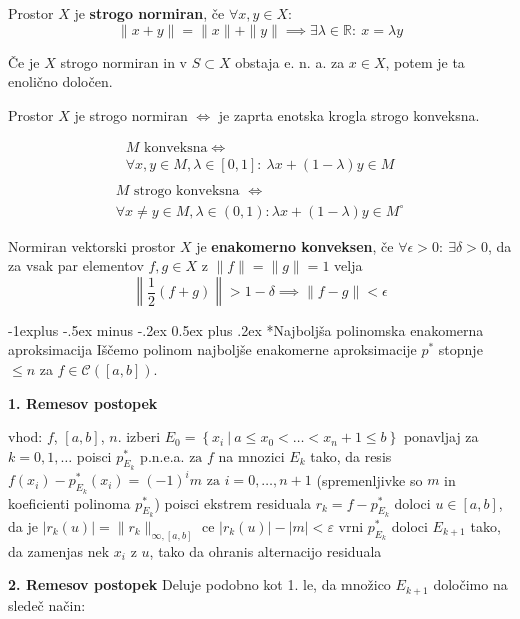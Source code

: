 \documentclass[a3paper,9pt]{extarticle}
\makeatletter
\renewcommand{\subsection}{\@startsection{subsection}{2}{0mm}%
                                {-1explus -.5ex minus -.2ex}%
                                {0.5ex plus .2ex}%
                                {\normalfont\normalsize\bfseries}}
\makeatother
\begin{document}
\begin{multicols}{5}
Prostor $X$ je \textbf{strogo normiran}, če $\forall x, y \in X$:
\[ \| x + y \| = \| x \| + \| y \| \implies \exists \lambda \in \mathbb{R} : \ x = \lambda y  \]

Če je $X$ strogo normiran in v $S \subset X$ obstaja e. n. a. za $x \in X$, potem je ta enolično določen.


Prostor $X$ je strogo normiran $\iff$ je zaprta enotska krogla strogo konveksna.

\begin{multline*}
	M \text{ konveksna} \iff \\
	\forall x, y \in M, \lambda \in [0, 1] : \ \lambda x + (1-\lambda) y \in M \\
\end{multline*}
\begin{multline*}
	M \text{ strogo konveksna } \iff \\
	\forall x \neq y \in M, \lambda \in (0, 1) : \lambda x + (1-\lambda) y \in M^\circ
\end{multline*}

Normiran vektorski prostor $X$ je \textbf{enakomerno konveksen}, če $\forall \epsilon > 0 : \ \exists \delta > 0$, da za vsak par elementov $f, g \in X$ z $\| f \| = \| g \| = 1$ velja
\[ \left\| \frac{1}{2} (f+g) \right\| > 1 - \delta \implies \| f-g \| < \epsilon \]

\subsection*{Najboljša polinomska enakomerna aproksimacija}
Iščemo polinom najboljše enakomerne aproksimacije $p^*$ stopnje $\leq n$ za $f \in \mathcal{C}([a, b])$. 

\textbf{1. Remesov postopek} 

\begin{koda}
vhod: $f$, $[a, b]$, $n$.
izberi $E_0 = \left\{ x_i\ |\ a \leq x_0 < \dots < x_n+1 \leq b \right\}$
ponavljaj za $k = 0, 1, \dots$
	poisci $p_{E_k}^*$ p.n.e.a. $\text{za}$ $f$ na mnozici $E_k$ tako, da resis 
		$f(x_i) - p_{E_k}^*(x_i) = (-1)^i m$  $\text{za } i = 0, \dots, n+1$
		(spremenljivke so $m$ in koeficienti polinoma $p_{E_k}^*$)
	poisci ekstrem residuala $r_k = f - p_{E_k}^*$
	doloci $u \in [a, b]$, da je $| r_k(u) | = \| r_k \|_{\infty, [a, b]}$
	ce $| r_k(u) | - |m| < \varepsilon$
		vrni $p_{E_k}^*$ 
	doloci $E_{k+1}$ tako, da zamenjas nek $x_i$ z $u$, tako da 
	ohranis alternacijo residuala 
\end{koda}

\textbf{2. Remesov postopek}
Deluje podobno kot 1. le, da množico $E_{k+1}$ določimo na sledeč način:


\end{multicols}
\end{document}
